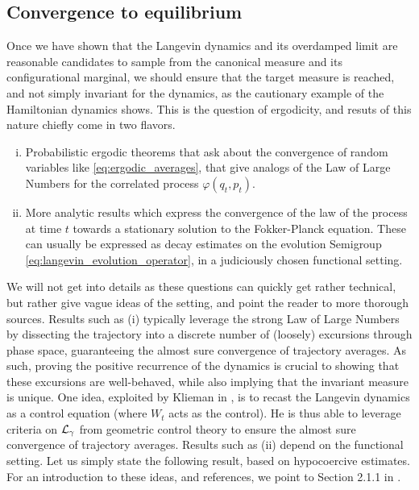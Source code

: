         \subsection{Convergence to equilibrium}
        Once we have shown that the Langevin dynamics and its overdamped limit are reasonable candidates to sample from the canonical measure and its configurational marginal,
        we should ensure that the target measure is reached, and not simply invariant for the dynamics, as the cautionary example of the Hamiltonian dynamics shows.
        This is the question of ergodicity, and resuts of this nature chiefly come in two flavors.
        \begin{enumerate}[(i)]
            \item Probabilistic ergodic theorems that ask about the convergence of random variables like \eqref{eq:ergodic_averages}, that give analogs of the Law of Large Numbers for the correlated process $\varphi(q_t,p_t)$.
            \item More analytic results which express the convergence of the law of the process at time $t$ towards a stationary solution to the Fokker-Planck equation. These can usually be expressed as decay estimates on the evolution Semigroup \eqref{eq:langevin_evolution_operator}, in a judiciously chosen functional setting.
        \end{enumerate}
        We will not get into details as these questions can quickly get rather technical, but rather give vague ideas of the setting, and point the reader to more thorough sources.
        Results such as (i) typically leverage the strong Law of Large Numbers by dissecting the trajectory into a discrete number of (loosely) \iid excursions through phase space, guaranteeing the almost sure convergence of trajectory averages.
        As such, proving the positive recurrence of the dynamics is crucial to showing that these excursions are well-behaved, while also implying that the invariant measure is unique.
        One idea, exploited by Klieman in \cite{K87}, is to recast the Langevin dynamics as a control equation (where $W_t$ acts as the control). 
        He is thus able to leverage criteria on $\mathcal{L}_\gamma$ from geometric control theory to ensure the almost sure convergence of trajectory averages.
        Results such as (ii) depend on the functional setting. Let us simply state the following result, based on hypocoercive estimates. 
        For an introduction to these ideas, and references, we point to Section 2.1.1 in \cite{LMS13}.
